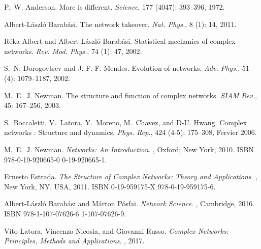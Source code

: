 P.~W. Anderson.
\newblock More is different.
\newblock \emph{Science}, 177 (4047): 393--396, 1972.

Albert-L{\'a}szl{\'o} Barab{\'a}si.
\newblock The network takeover.
\newblock \emph{Nat. Phys.}, 8 (1): 14, 2011.

R{\'e}ka Albert and Albert-L{\'a}szl{\'o} Barab{\'a}si.
\newblock Statistical mechanics of complex networks.
\newblock \emph{Rev. Mod. Phys.}, 74 (1): 47, 2002.

S.~N. Dorogovtsev and {J. F. F. Mendes}.
\newblock Evolution of networks.
\newblock \emph{Adv. Phys.}, 51 (4): 1079--1187, 2002.

M.~E.~J. Newman.
\newblock The structure and function of complex networks.
\newblock \emph{SIAM Rev.}, 45: 167--256, 2003{}.

S.~Boccaletti, V.~Latora, Y.~Moreno, M.~Chavez, and D-U. Hwang.
\newblock Complex networks : {{Structure}} and dynamics.
\newblock \emph{Phys. Rep.}, 424 (4-5): 175--308, Fervier
2006.

M.~E.~J. Newman.
\newblock \emph{Networks: An Introduction}.
, {Oxford; New York}, 2010.
\newblock ISBN 978-0-19-920665-0 0-19-920665-1.

Ernesto Estrada.
\newblock \emph{The Structure of Complex Networks: {{Theory}} and
    Applications}.
, {New York, NY, USA}, 2011.
\newblock ISBN 0-19-959175-X 978-0-19-959175-6.

Albert-L{\'a}szl{\'o} Barab{\'a}si and M{\'a}rton P{\'o}sfai.
\newblock \emph{Network Science}.
, {Cambridge}, 2016.
\newblock ISBN 978-1-107-07626-6 1-107-07626-9.

Vito Latora, Vincenzo Nicosia, and Giovanni Russo.
\newblock \emph{Complex Networks: {{Principles}}, Methods and Applications}.
, 2017.

